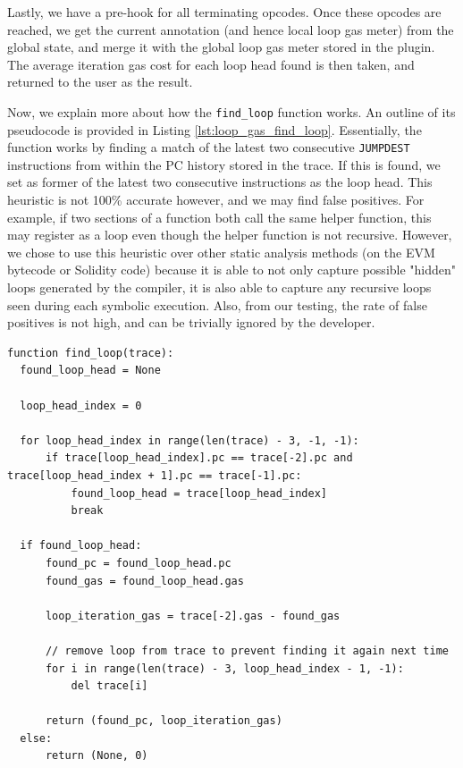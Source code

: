 Lastly, we have a pre-hook for all terminating opcodes. Once these opcodes are reached, we
get the current annotation (and hence local loop gas meter) from the global state, and merge it with
the global loop gas meter stored in the plugin. The average iteration gas cost for each loop head found
is then taken, and returned to the user as the result.

Now, we explain more about how the \texttt{find_loop} function works. An outline of its
pseudocode is provided in Listing \ref{lst:loop_gas_find_loop}. Essentially, the
function works by finding a match of the latest two consecutive \texttt{JUMPDEST} instructions
from within the PC history stored in the trace. If this is found, we set as former of the latest
two consecutive instructions as the loop head. This heuristic is not 100\% accurate however,
and we may find false positives. For example, if two sections of a function both call the same
helper function, this may register as a loop even though the helper function is not recursive.
However, we chose to use this heuristic over other static analysis methods (on the EVM bytecode
or Solidity code) because it is able to not only capture possible "hidden" loops generated
by the compiler, it is also able to capture any recursive loops seen during each symbolic execution.
Also, from our testing, the rate of false positives is not high, and can be trivially ignored 
by the developer.

\begin{lstlisting}[language=Pseudocode, caption={\texttt{find_loop} function}, label={lst:loop_gas_find_loop}, basicstyle=\ttfamily\scriptsize]
function find_loop(trace):
  found_loop_head = None
              
  loop_head_index = 0

  for loop_head_index in range(len(trace) - 3, -1, -1):
      if trace[loop_head_index].pc == trace[-2].pc and trace[loop_head_index + 1].pc == trace[-1].pc:
          found_loop_head = trace[loop_head_index]
          break

  if found_loop_head:
      found_pc = found_loop_head.pc
      found_gas = found_loop_head.gas
      
      loop_iteration_gas = trace[-2].gas - found_gas
      
      // remove loop from trace to prevent finding it again next time
      for i in range(len(trace) - 3, loop_head_index - 1, -1):
          del trace[i]
      
      return (found_pc, loop_iteration_gas)
  else:
      return (None, 0)
\end{lstlisting}

